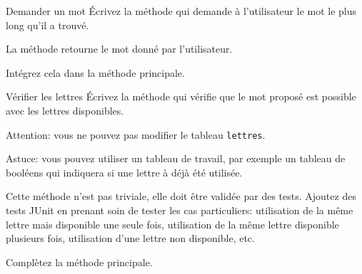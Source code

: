 \documentclass[a4paper,11pt]{style-esi/td}
\begin{document}
	
 	\begin{Exercice}{Demander un mot}
		\'Ecrivez la méthode 
		qui demande à l'utilisateur le mot le plus long qu'il a trouvé.
		 
		La méthode retourne le mot donné par l'utilisateur. 
		
		Intégrez cela dans la méthode principale.
	\end{Exercice} 
	
 	\begin{Exercice}{Vérifier les lettres}
 			\'Ecrivez la méthode 
		qui vérifie que le mot proposé est possible avec les lettres 
		disponibles. 
		
		Attention: vous ne pouvez pas modifier le tableau \texttt{lettres}.
		
		Astuce: vous pouvez utiliser un tableau de travail, par exemple un 
		tableau de booléens qui indiquera si une lettre à déjà été utilisée.
		
		Cette méthode n'est pas triviale, elle doit être validée par des tests.
		Ajoutez des tests JUnit en prenant soin de tester les cas particuliers: 
		utilisation de la même lettre mais disponible une seule fois, utilisation de la 
		même lettre disponible plusieurs fois, utilisation d'une lettre non 
		disponible, etc.
		
		Complètez la méthode principale.
	\end{Exercice} 
	
\end{document}
